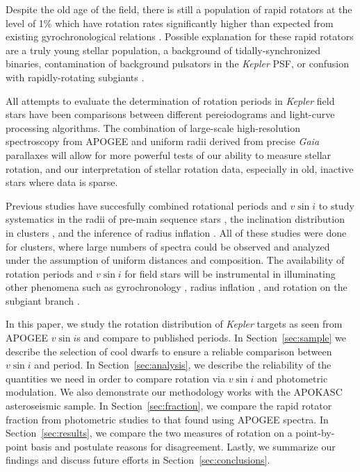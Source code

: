 \documentclass[manuscript]{aastex6}
\newcommand{\vsini}{\ensuremath{v \sin i}}
\newcommand{\Kepler}{\mbox{\textit{Kepler}}}
\newcommand{\Gaia}{\mbox{\textit{Gaia}}}
\begin{document}
Despite the old age of the
field, there is still a population of rapid rotators at the level of 1\% 
which have rotation rates significantly higher than expected from
existing gyrochronological relations \citep{McQuillan14}. Possible explanation
for these rapid rotators are a truly young stellar population, a background of
tidally-synchronized binaries, contamination of background pulsators in the
\Kepler{} PSF, or confusion with rapidly-rotating subgiants \citep{vanSaders13}. 

All attempts to evaluate the determination of rotation periods in
\Kepler{} field stars have been comparisons between different pereiodograms and
light-curve processing algorithms. The combination of large-scale
high-resolution spectroscopy from APOGEE and uniform radii derived from precise
\Gaia{} parallaxes \citep{Stevens17} will allow for more powerful tests of our
ability to measure stellar rotation, and our interpretation of stellar rotation
data, especially in old, inactive stars where data is sparse.

Previous studies have succesfully combined rotational periods and \vsini{} 
to study systematics in the radii of pre-main sequence stars
\citep{Rhode01,Jeffries07}, the inclination distribution in clusters 
\citep{Jackson10}, and the inference of radius inflation
\citep{Jackson09,Jackson16,Jackson18}. All of these studies were done for
clusters, where large numbers of spectra could be observed and analyzed under 
the assumption of uniform distances and composition. The availability of
rotation periods and \vsini{} for field stars will be instrumental in 
illuminating other phenomena such as gyrochronology 
\citep{Barnes07,Mamajek08,Angus15}, radius inflation \citep{Jackson18}, and 
rotation on the subgiant branch \citep{vanSaders13}.

In this paper, we study the rotation distribution of \Kepler{} targets as
seen from APOGEE \vsini{}s and compare to published periods. In 
Section~\ref{sec:sample} we describe the
selection of cool dwarfs to ensure a reliable comparison between
\vsini{} and period. In Section~\ref{sec:analysis}, we describe the reliability
of the quantities we need in order to compare rotation via \vsini{} and
photometric modulation. We also demonstrate our methodology works with the 
APOKASC asteroseismic sample. In Section~\ref{sec:fraction}, we compare the 
rapid rotator fraction from photometric studies to that found using APOGEE 
spectra. In Section~\ref{sec:results}, we compare the two measures of 
rotation on a point-by-point basis and postulate reasons for disagreement. 
Lastly, we summarize our findings and discuss future efforts in 
Section~\ref{sec:conclusions}.
\end{document}
